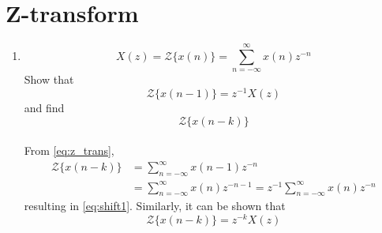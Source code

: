 \documentclass[journal,12pt,twocolumn]{IEEEtran}
\renewcommand\thesection{\arabic{section}}
\begin{document}
\section{Z-transform}

\begin{enumerate}[label=\thesection.\arabic*,ref=\thesection.\theenumi]

\item
\label{prob:Z-transform_formula}
%
\begin{equation}
\label{eq:z_trans}
X(z)={\mathcal {Z}}\{x(n)\}=\sum _{n=-\infty }^{\infty }x(n)z^{-n}
\end{equation}
%
Show that
\begin{equation}
\label{eq:shift1}
{\mathcal {Z}}\{x(n-1)\} = z^{-1}X(z)
\end{equation}
and find
\begin{equation}
	{\mathcal {Z}}\{x(n-k)\} 
\end{equation}
\\
\solution From \eqref{eq:z_trans},
\begin{align}
{\mathcal {Z}}\{x(n-k)\} &=\sum _{n=-\infty }^{\infty }x(n-1)z^{-n}
\\
&=\sum _{n=-\infty }^{\infty }x(n)z^{-n-1} = z^{-1}\sum _{n=-\infty }^{\infty }x(n)z^{-n}
\end{align}
resulting in \eqref{eq:shift1}. Similarly, it can be shown that
%
\begin{equation}
\label{eq:z_trans_shift}
	{\mathcal {Z}}\{x(n-k)\} = z^{-k}X(z)
\end{equation}


\end{enumerate}
\end{document}
